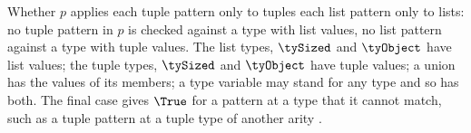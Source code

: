Whether $p$ applies each tuple pattern only to tuples each list pattern only to lists: no tuple
pattern in $p$ is checked against a type with list values,  no list pattern against a type with tuple
values. The list types, $\tySized$ and $\tyObject$ have list values; the tuple types, $\tySized$ and
$\tyObject$ have tuple values; a union has the values of its members; a type variable may stand for any type and so has both. The final case gives $\True$ for a
pattern at a type that it cannot match, such as a tuple pattern at a tuple type of another arity .
